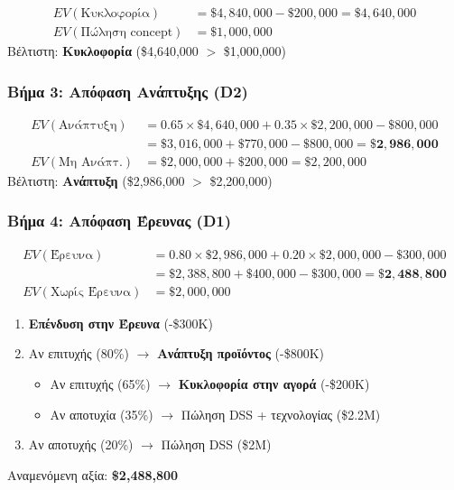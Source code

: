 \documentclass[a4paper,12pt]{article}
\begin{document}
\begin{align}
EV(\text{Κυκλοφορία}) &= \$4{,}840{,}000 - \$200{,}000 = \$4{,}640{,}000 \\
EV(\text{Πώληση concept}) &= \$1{,}000{,}000
\end{align}
Βέλτιστη: \textbf{Κυκλοφορία} (\$4,640,000 $>$ \$1,000,000)

\subsubsection{Βήμα 3: Απόφαση Ανάπτυξης (D2)}

\begin{align}
EV(\text{Ανάπτυξη}) &= 0.65 \times \$4{,}640{,}000 + 0.35 \times \$2{,}200{,}000 - \$800{,}000 \nonumber \\
&= \$3{,}016{,}000 + \$770{,}000 - \$800{,}000 = \mathbf{\$2{,}986{,}000} \\
EV(\text{Μη Ανάπτ.}) &= \$2{,}000{,}000 + \$200{,}000 = \$2{,}200{,}000
\end{align}
Βέλτιστη: \textbf{Ανάπτυξη} (\$2,986,000 $>$ \$2,200,000)

\subsubsection{Βήμα 4: Απόφαση Έρευνας (D1)}

\begin{align}
EV(\text{Έρευνα}) &= 0.80 \times \$2{,}986{,}000 + 0.20 \times \$2{,}000{,}000 - \$300{,}000 \nonumber \\
&= \$2{,}388{,}800 + \$400{,}000 - \$300{,}000 = \mathbf{\$2{,}488{,}800} \\
EV(\text{Χωρίς Έρευνα}) &= \$2{,}000{,}000
\end{align}

\begin{tcolorbox}[colback=green!10, colframe=decisiongreen, title=Βέλτιστη Πολιτική -- BAAG/DSS]
\begin{enumerate}
    \item \textbf{Επένδυση στην Έρευνα} (-\$300K)
    \item Αν επιτυχής (80\%) $\rightarrow$ \textbf{Ανάπτυξη προϊόντος} (-\$800K)
    \begin{itemize}
        \item Αν επιτυχής (65\%) $\rightarrow$ \textbf{Κυκλοφορία στην αγορά} (-\$200K)
        \item Αν αποτυχία (35\%) $\rightarrow$ Πώληση DSS + τεχνολογίας (\$2.2M)
    \end{itemize}
    \item Αν αποτυχής (20\%) $\rightarrow$ Πώληση DSS (\$2M)
\end{enumerate}
Αναμενόμενη αξία: \textbf{\$2,488,800}
\end{tcolorbox}
\end{document}

